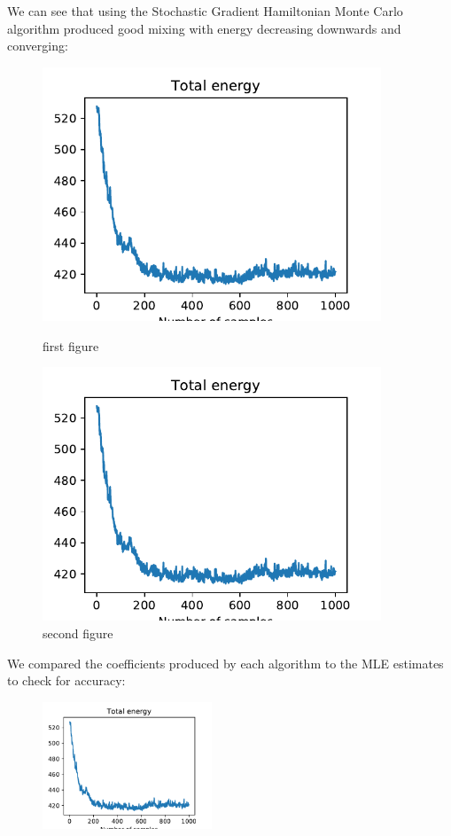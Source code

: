 We can see that using the Stochastic Gradient Hamiltonian Monte Carlo algorithm produced good mixing with energy decreasing downwards and converging:

\begin{figure}[h!]
	\centering
	\begin{minipage}{0.45\textwidth}
		\centering
		\includegraphics[width=0.9\textwidth]{hmc-energy-pima.pdf} %
		\caption{first figure}
	\end{minipage}\hfill
	\begin{minipage}{0.45\textwidth}
		\centering
		\includegraphics[width=0.9\textwidth]{hmc-energy-pima.pdf} %
		\caption{second figure}
	\end{minipage}
\end{figure}


We compared the coefficients produced by each algorithm to the MLE estimates to check for accuracy:

\begin{figure}[h!]
	\centering
	\includegraphics[width=0.45\textwidth]{hmc-energy-pima.pdf}
\end{figure}


